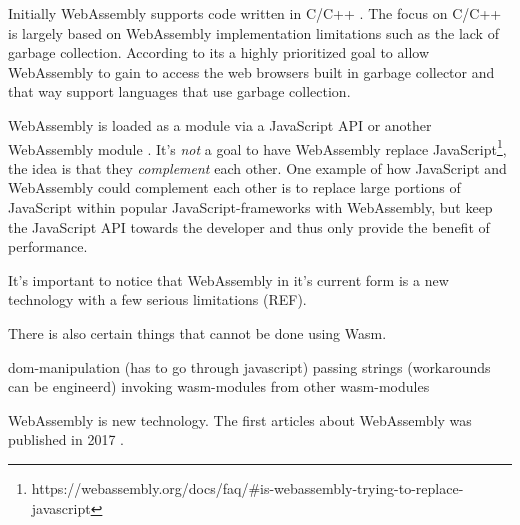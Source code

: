 Initially WebAssembly supports code written in C/C++ \parencite{HaasRossbergSchuffTitzerHolmanGohmanWagnerZakaiBastien2017}. 
The focus on C/C++ is largely based on WebAssembly implementation limitations such as the lack of garbage collection. According to \textcite{HaasRossbergSchuffTitzerHolmanGohmanWagnerZakaiBastien2017} its a highly prioritized goal to allow WebAssembly to gain to access the web browsers built in garbage collector and that way support languages that use garbage collection.

WebAssembly is loaded as a module via a JavaScript API or another WebAssembly module \parencite{HaasRossbergSchuffTitzerHolmanGohmanWagnerZakaiBastien2017}. It's \emph{not} a goal to have WebAssembly replace JavaScript\footnote{https://webassembly.org/docs/faq/\#is-webassembly-trying-to-replace-javascript}, the idea is that they \emph{complement} each other. One example of how JavaScript and WebAssembly could complement each other is to replace large portions of JavaScript within popular JavaScript-frameworks with WebAssembly, but keep the JavaScript API towards the developer and thus only provide the benefit of performance.

It's important to notice that WebAssembly in it's current form is a new technology with a few serious limitations (REF). 

There is also certain things that cannot be done using Wasm.

dom-manipulation (has to go through javascript)
passing strings (workarounds can be engineerd)
invoking wasm-modules from other wasm-modules

WebAssembly is new technology. The first articles about WebAssembly was published in 2017 \parencite{HaasRossbergSchuffTitzerHolmanGohmanWagnerZakaiBastien2017,ReiserBlaser2017}.
